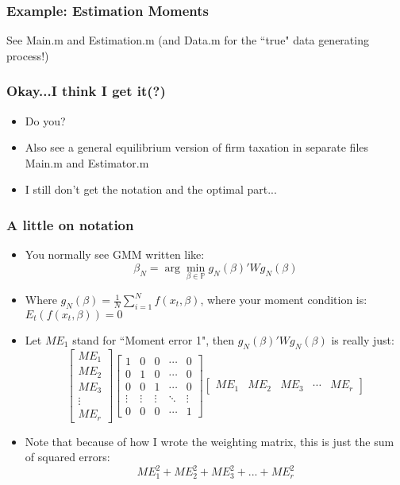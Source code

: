 \documentclass{beamer}
\begin{document}
\begin{frame}
\frametitle{Example: Estimation Moments}
See Main.m and Estimation.m (and Data.m for the ``true" data generating process!)
\end{frame}


\begin{frame}
\frametitle{Okay...I think I get it(?)}
\begin{itemize}
\item<2-> Do you?
\bigskip
\item<3->  Also see a general equilibrium version of firm taxation in separate files Main.m and Estimator.m
\bigskip
\item<3-> I still don't get the notation and the optimal part...
\end{itemize}
\end{frame}

\begin{frame}
\frametitle{A little on notation}
\begin{itemize}
\item You normally see GMM written like:
$$\beta_N=\arg\underset{\beta\in\mathbb{P}}{\min}g_N(\beta)'Wg_N(\beta)$$
\item Where $g_N(\beta) = \frac{1}{N}\sum_{i=1}^Nf(x_t,\beta)$, where your moment condition is: $E_t(f(x_t,\beta))=0$
\bigskip
\item Let $ME_1$ stand for ``Moment error 1", then $g_N(\beta)'Wg_N(\beta)$ is really just:
$$\left[\begin{array}{c}ME_1 \\ ME_2 \\ ME_3 \\ \vdots \\ ME_r\end{array}\right]\left[\begin{array}{ccccc}1 & 0 & 0 & \cdots & 0 \\ 0 & 1 & 0 & \cdots & 0  \\ 0 & 0 & 1 & \cdots & 0 \\ \vdots & \vdots & \vdots & \ddots & 
\vdots \\ 0 & 0 & 0 & \cdots & 1\end{array}\right]\left[\begin{array}{ccccc}ME_1 & ME_2 & ME_3 & \cdots & ME_r\end{array}\right]$$
\item Note that because of how I wrote the weighting matrix, this is just the sum of squared errors:
$$ME_1^2+ME_2^2+ME_3^2+...+ME_r^2$$
\end{itemize}
\end{frame}
\end{document}
